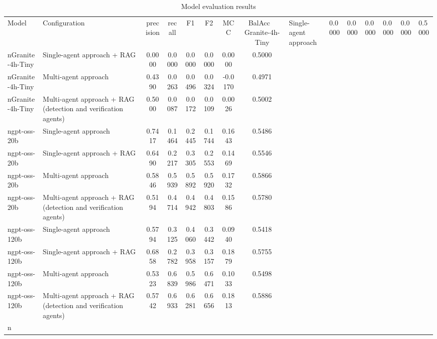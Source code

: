 \begin{table}[htbp]
\centering
\caption{Model evaluation results}
\label{tab:results}
\begin{tabular}{llcccccc}
\toprule
Model & Configuration & precision & recall & F1 & F2 & MCC & BalAcc \
\midrule
Granite-4h-Tiny & Single-agent approach & 0.0000 & 0.0000 & 0.0000 & 0.0000 & 0.0000 & 0.5000 \\nGranite-4h-Tiny & Single-agent approach + RAG & 0.0000 & 0.0000 & 0.0000 & 0.0000 & 0.0000 & 0.5000 \\nGranite-4h-Tiny & Multi-agent approach & 0.4390 & 0.0263 & 0.0496 & 0.0324 & -0.0170 & 0.4971 \\nGranite-4h-Tiny & Multi-agent approach + RAG (detection and verification agents) & 0.5000 & 0.0087 & 0.0172 & 0.0109 & 0.0026 & 0.5002 \\ngpt-oss-20b & Single-agent approach & 0.7417 & 0.1464 & 0.2445 & 0.1744 & 0.1643 & 0.5486 \\ngpt-oss-20b & Single-agent approach + RAG & 0.6490 & 0.2217 & 0.3305 & 0.2553 & 0.1469 & 0.5546 \\ngpt-oss-20b & Multi-agent approach & 0.5846 & 0.5939 & 0.5892 & 0.5920 & 0.1732 & 0.5866 \\ngpt-oss-20b & Multi-agent approach + RAG (detection and verification agents) & 0.5194 & 0.4714 & 0.4942 & 0.4803 & 0.1586 & 0.5780 \\ngpt-oss-120b & Single-agent approach & 0.5794 & 0.3125 & 0.4060 & 0.3442 & 0.0940 & 0.5418 \\ngpt-oss-120b & Single-agent approach + RAG & 0.6858 & 0.2782 & 0.3958 & 0.3157 & 0.1879 & 0.5755 \\ngpt-oss-120b & Multi-agent approach & 0.5323 & 0.6839 & 0.5986 & 0.6471 & 0.1033 & 0.5498 \\ngpt-oss-120b & Multi-agent approach + RAG (detection and verification agents) & 0.5742 & 0.6933 & 0.6281 & 0.6656 & 0.1813 & 0.5886 \\n\bottomrule
\end{tabular}
\end{table}
